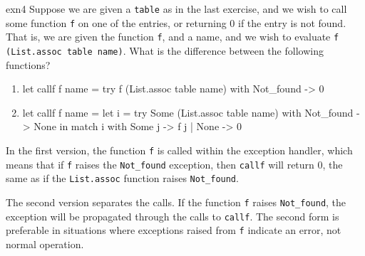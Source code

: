 %
\begin{exercise}{exn4}
Suppose we are given a \lstinline+table+ as in the last exercise, and we wish to call some function
\lstinline+f+ on one of the entries, or returning 0 if the entry is not found.  That is, we are given the
function \lstinline+f+, and a name, and we wish to evaluate \lstinline+f (List.assoc table name)+.  What is
the difference between the following functions?

\begin{enumerate}
\item 
\begin{center}
\begin{ocaml}
let callf f name =
   try f (List.assoc table name) with
      Not_found ->
         0
\end{ocaml}
\end{center}

\item
\begin{center}
\begin{ocaml}
let callf f name =
   let i =
      try Some (List.assoc table name) with
         Not_found ->
            None
   in
      match i with
         Some j -> f j
       | None -> 0
\end{ocaml}
\end{center}
\end{enumerate}

\begin{answer}\ifanswers
In the first version, the function \lstinline+f+ is called within the exception handler, which means that
if \lstinline+f+ raises the \lstinline+Not_found+ exception, then \lstinline+callf+ will return 0, the same as if
the \lstinline+List.assoc+ function raises \lstinline+Not_found+.

The second version separates the calls.  If the function \lstinline+f+ raises \lstinline+Not_found+, the
exception will be propagated through the calls to \lstinline+callf+.  The second form is preferable in
situations where exceptions raised from \lstinline+f+ indicate an error, not normal operation.
\fi\end{answer}
\end{exercise}

